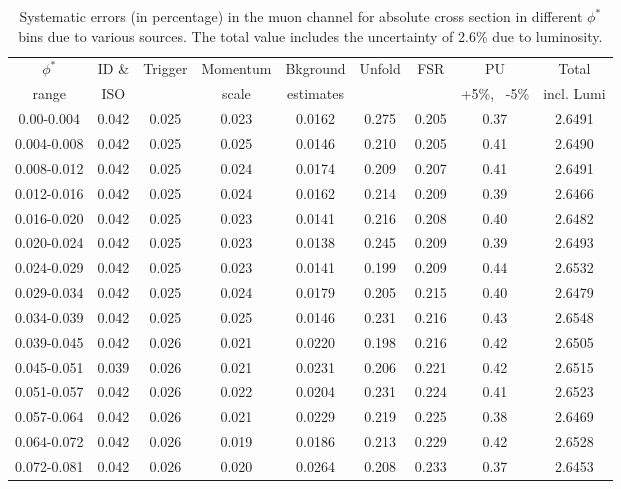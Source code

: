 \begin{table}
\caption{Systematic errors (in percentage) in the muon channel for absolute cross section in different $\phi^*$ bins  due to various sources. The total value includes the uncertainty of 2.6\% due to luminosity. } 
\label{tab:musyst}
\begin{center}
\begin{tabular}{ | c | c | c | c | c | c | c | c | c| }
\hline
$\phi^*$ & ID \& & Trigger & Momentum & Bkground & Unfold & FSR & PU & Total \\
range &ISO & & scale& estimates & & & +5\%, ~-5\% &incl. Lumi \\
\hline
0.00-0.004  & 0.042 & 0.025 & 0.023 & 0.0162  & 0.275  &  0.205 & 0.37  & 2.6491\\
\hline
0.004-0.008 & 0.042 & 0.025 & 0.025 & 0.0146  & 0.210  &  0.205 & 0.41  & 2.6490 \\
\hline
0.008-0.012 & 0.042 & 0.025 & 0.024 & 0.0174  & 0.209  &  0.207 & 0.41  & 2.6491 \\
\hline
0.012-0.016 & 0.042 & 0.025 & 0.024 & 0.0162  & 0.214  &  0.209 & 0.39  & 2.6466 \\
\hline
0.016-0.020 & 0.042 & 0.025 & 0.023 & 0.0141  & 0.216  &  0.208 & 0.40  & 2.6482 \\
\hline
0.020-0.024 & 0.042 & 0.025 & 0.023 & 0.0138  & 0.245  &  0.209 & 0.39  & 2.6493 \\
\hline
0.024-0.029 & 0.042 & 0.025 & 0.023 & 0.0141  & 0.199  &  0.209 & 0.44  & 2.6532 \\
\hline
0.029-0.034 & 0.042 & 0.025 & 0.024 & 0.0179  & 0.205  &  0.215 & 0.40  & 2.6479 \\
\hline
0.034-0.039 & 0.042 & 0.025 & 0.025 & 0.0146  & 0.231  &  0.216 & 0.43  & 2.6548 \\
\hline
0.039-0.045 & 0.042 & 0.026 & 0.021 & 0.0220  & 0.198  &  0.216 & 0.42  & 2.6505 \\
\hline
0.045-0.051 & 0.039 & 0.026 & 0.021 & 0.0231  & 0.206  &  0.221 & 0.42  & 2.6515 \\
\hline
0.051-0.057 & 0.042 & 0.026 & 0.022 & 0.0204  & 0.231  &  0.224 & 0.41  & 2.6523 \\
\hline
0.057-0.064 & 0.042 & 0.026 & 0.021 & 0.0229  & 0.219  &  0.225 & 0.38  & 2.6469 \\
\hline
0.064-0.072 & 0.042 & 0.026 & 0.019 & 0.0186  & 0.213  &  0.229 & 0.42  & 2.6528 \\
\hline
0.072-0.081 & 0.042 & 0.026 & 0.020 & 0.0264  & 0.208  &  0.233 & 0.37  & 2.6453 \\

\end{tabular}
\end{center}
\end{table}
